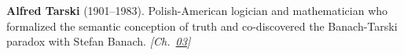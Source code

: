\textbf{Alfred Tarski} (1901–1983). Polish-American logician and mathematician who formalized the semantic conception of truth and co-discovered the Banach-Tarski paradox with Stefan Banach. \emph{[Ch.~\hyperref[ch:banach]{03}]}

